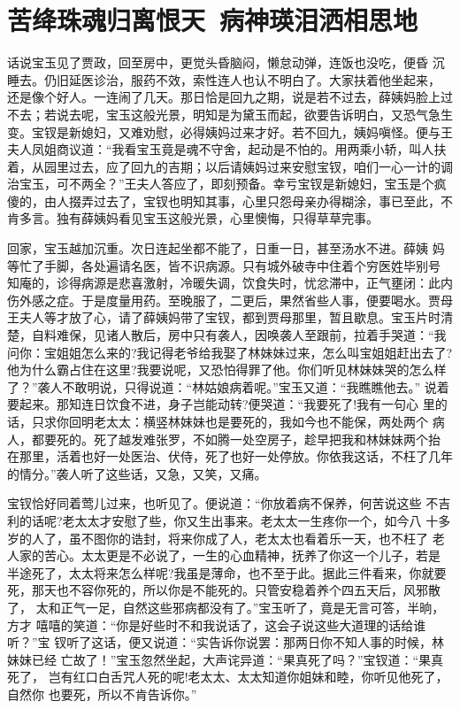 \chapter{苦绛珠魂归离恨天~病神瑛泪洒相思地}

话说宝玉见了贾政，回至房中，更觉头昏脑闷，懒怠动弹，连饭也没吃，便昏
沉睡去。仍旧延医诊治，服药不效，索性连人也认不明白了。大家扶着他坐起来，
还是像个好人。一连闹了几天。那日恰是回九之期，说是若不过去，薛姨妈脸上过
不去；若说去呢，宝玉这般光景，明知是为黛玉而起，欲要告诉明白，又恐气急生
变。宝钗是新媳妇，又难劝慰，必得姨妈过来才好。若不回九，姨妈嗔怪。便与王
夫人凤姐商议道：“我看宝玉竟是魂不守舍，起动是不怕的。用两乘小轿，叫人扶
着，从园里过去，应了回九的吉期；以后请姨妈过来安慰宝钗，咱们一心一计的调
治宝玉，可不两全？”王夫人答应了，即刻预备。幸亏宝钗是新媳妇，宝玉是个疯
傻的，由人掇弄过去了，宝钗也明知其事，心里只怨母亲办得糊涂，事已至此，不
肯多言。独有薛姨妈看见宝玉这般光景，心里懊悔，只得草草完事。

回家，宝玉越加沉重。次日连起坐都不能了，日重一日，甚至汤水不进。薛姨
妈等忙了手脚，各处遍请名医，皆不识病源。只有城外破寺中住着个穷医姓毕别号
知庵的，诊得病源是悲喜激射，冷暖失调，饮食失时，忧忿滞中，正气壅闭：此内
伤外感之症。于是度量用药。至晚服了，二更后，果然省些人事，便要喝水。贾母
王夫人等才放了心，请了薛姨妈带了宝钗，都到贾母那里，暂且歇息。宝玉片时清
楚，自料难保，见诸人散后，房中只有袭人，因唤袭人至跟前，拉着手哭道：“我
问你：宝姐姐怎么来的?我记得老爷给我娶了林妹妹过来，怎么叫宝姐姐赶出去了?
他为什么霸占住在这里?我要说呢，又恐怕得罪了他。你们听见林妹妹哭的怎么样
了？”袭人不敢明说，只得说道：“林姑娘病着呢。”宝玉又道：“我瞧瞧他去。”
说着要起来。那知连日饮食不进，身子岂能动转?便哭道：“我要死了!我有一句心
里的话，只求你回明老太太：横竖林妹妹也是要死的，我如今也不能保，两处两个
病人，都要死的。死了越发难张罗，不如腾一处空房子，趁早把我和林妹妹两个抬
在那里，活着也好一处医治、伏侍，死了也好一处停放。你依我这话，不枉了几年
的情分。”袭人听了这些话，又急，又笑，又痛。

宝钗恰好同着莺儿过来，也听见了。便说道：“你放着病不保养，何苦说这些
不吉利的话呢?老太太才安慰了些，你又生出事来。老太太一生疼你一个，如今八
十多岁的人了，虽不图你的诰封，将来你成了人，老太太也看着乐一天，也不枉了
老人家的苦心。太太更是不必说了，一生的心血精神，抚养了你这一个儿子，若是
半途死了，太太将来怎么样呢?我虽是薄命，也不至于此。据此三件看来，你就要
死，那天也不容你死的，所以你是不能死的。只管安稳着养个四五天后，风邪散了，
太和正气一足，自然这些邪病都没有了。”宝玉听了，竟是无言可答，半晌，方才
嘻嘻的笑道：“你是好些时不和我说话了，这会子说这些大道理的话给谁听？”宝
钗听了这话，便又说道：“实告诉你说罢：那两日你不知人事的时候，林妹妹已经
亡故了！”宝玉忽然坐起，大声诧异道：“果真死了吗？”宝钗道：“果真死了，
岂有红口白舌咒人死的呢!老太太、太太知道你姐妹和睦，你听见他死了，自然你
也要死，所以不肯告诉你。”

